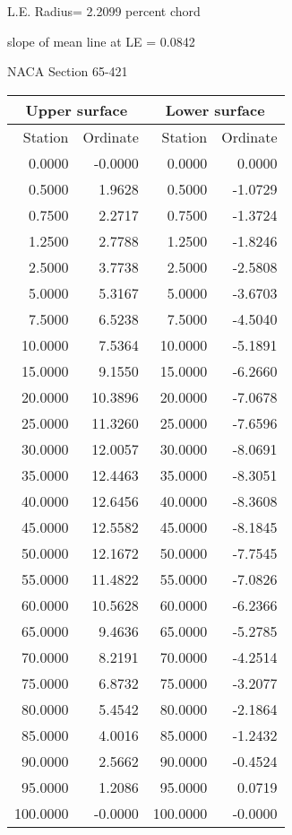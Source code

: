 \documentclass[11pt]{book}
\begin{document}
L.E. Radius=  2.2099 percent chord


 slope of mean line at LE =  0.0842
 \newpage
  \label{s65-421}
 \begin{Large}
 NACA Section 65-421
 \end{Large}
  
 \vspace{8mm}
 \begin{tabular}{|r|r|r|r|} \hline 
 \multicolumn{2}{|c|}{Upper surface} & \multicolumn{2}{|c|}{Lower surface} \\
 \hline
 Station & Ordinate & Station & Ordinate \\
 \hline
0.0000 & -0.0000 & 0.0000 & 0.0000 \\
0.5000 & 1.9628 & 0.5000 & -1.0729 \\
0.7500 & 2.2717 & 0.7500 & -1.3724 \\
1.2500 & 2.7788 & 1.2500 & -1.8246 \\
2.5000 & 3.7738 & 2.5000 & -2.5808 \\
5.0000 & 5.3167 & 5.0000 & -3.6703 \\
7.5000 & 6.5238 & 7.5000 & -4.5040 \\
10.0000 & 7.5364 & 10.0000 & -5.1891 \\
15.0000 & 9.1550 & 15.0000 & -6.2660 \\
20.0000 & 10.3896 & 20.0000 & -7.0678 \\
25.0000 & 11.3260 & 25.0000 & -7.6596 \\
30.0000 & 12.0057 & 30.0000 & -8.0691 \\
35.0000 & 12.4463 & 35.0000 & -8.3051 \\
40.0000 & 12.6456 & 40.0000 & -8.3608 \\
45.0000 & 12.5582 & 45.0000 & -8.1845 \\
50.0000 & 12.1672 & 50.0000 & -7.7545 \\
55.0000 & 11.4822 & 55.0000 & -7.0826 \\
60.0000 & 10.5628 & 60.0000 & -6.2366 \\
65.0000 & 9.4636 & 65.0000 & -5.2785 \\
70.0000 & 8.2191 & 70.0000 & -4.2514 \\
75.0000 & 6.8732 & 75.0000 & -3.2077 \\
80.0000 & 5.4542 & 80.0000 & -2.1864 \\
85.0000 & 4.0016 & 85.0000 & -1.2432 \\
90.0000 & 2.5662 & 90.0000 & -0.4524 \\
95.0000 & 1.2086 & 95.0000 & 0.0719 \\
100.0000 & -0.0000 & 100.0000 & -0.0000 \\
 \hline 
 \end{tabular}
\end{document}

